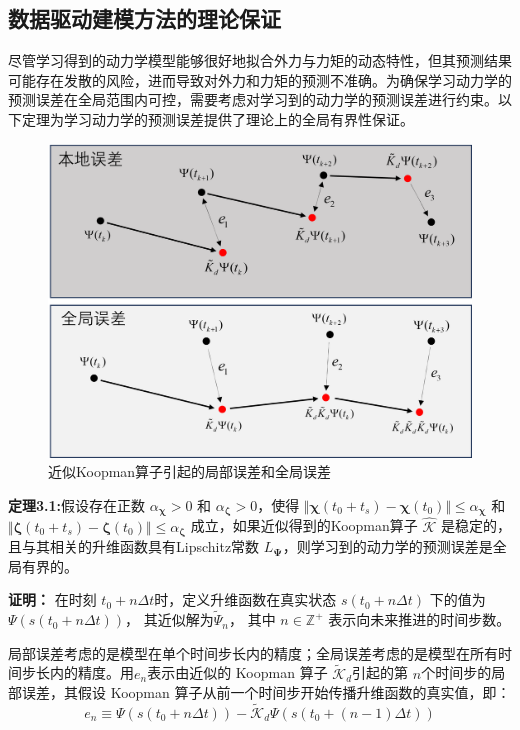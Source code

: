 \documentclass[lang=chs, degree=master, blindreview=true, winfonts=true]{yanputhesis}
\begin{document}
\subsection{数据驱动建模方法的理论保证}
尽管学习得到的动力学模型能够很好地拟合外力与力矩的动态特性，但其预测结果可能存在发散的风险，进而导致对外力和力矩的预测不准确。为确保学习动力学的预测误差在全局范围内可控，需要考虑对学习到的动力学的预测误差进行约束。以下定理为学习动力学的预测误差提供了理论上的全局有界性保证。
\begin{figure}[hbt!]
	\centering
	\includegraphics[width=28pc]{picture/3_2.png} 
	\caption{近似Koopman算子引起的局部误差和全局误差} \label{3_2}
\end{figure}

\textbf{定理3.1:}假设存在正数 $\alpha_{\bm{\chi}}>0$ 和 $\alpha_{\bm{\zeta}}>0$，使得 $\Vert \bm{\chi}(t_0+t_s)-\bm{\chi}(t_0)\Vert \le \alpha_{\bm{\chi}}$ 和 $\Vert \bm{\zeta}(t_0+t_s) - \bm{\zeta}(t_0) \Vert \le \alpha_{\bm{\zeta}}$ 成立，如果近似得到的Koopman算子 $\hat{{\mathcal{K}}}$ 是稳定的，且与其相关的升维函数具有Lipschitz常数 $L_{\bm{\Psi}}$，则学习到的动力学的预测误差是全局有界的。

\textbf{证明：}
在时刻 \( t_0 + n\Delta t \)时，定义升维函数在真实状态 \( s(t_0 + n\Delta t) \) 下的值为 
$
\Psi(s(t_0 + n\Delta t))$，
其近似解为$
\tilde{\Psi}_n
$，
其中 $ n \in \mathbb{Z}^+ $ 表示向未来推进的时间步数。

局部误差考虑的是模型在单个时间步长内的精度；全局误差考虑的是模型在所有时间步长内的精度。用$e_n$表示由近似的 Koopman 算子 \( \tilde{\mathcal{K}}_d \)引起的第 
\( n \)个时间步的局部误差，其假设 Koopman 算子从前一个时间步开始传播升维函数的真实值，即：
\begin{equation}
	e_n\equiv\Psi(s(t_0+n\Delta t))-\tilde{\mathcal{K}}_d\Psi(s(t_0+(n-1)\Delta t))
	\label{k}
\end{equation}
\end{document}
